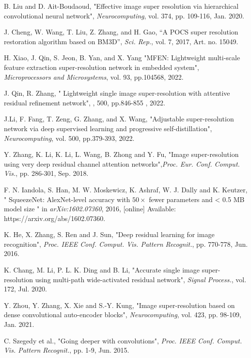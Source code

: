 \documentclass{ieeeaccess}
\begin{document}
\begin{thebibliography}{00}
 B. Liu and D. Ait-Boudaoud, "Effective image super resolution via hierarchical convolutional neural network", \textit{Neurocomputing}, vol. 374, pp. 109-116, Jan. 2020.



 J. Cheng, W. Wang, T. Liu, Z. Zhang, and H. Gao, “A POCS super resolution restoration algorithm based on BM3D”, \textit{Sci. Rep.}, vol. 7, 2017, Art. no. 15049.


 H. Xiao, J. Qin, S. Jeon, B. Yan, and X. Yang "MFEN: Lightweight multi-scale feature extraction super-resolution network in embedded system", \textit{Microprocessors and Microsystems}, vol. 93, pp.104568, 2022.


 J. Qin, R. Zhang, " Lightweight single image super-resolution with attentive residual refinement network", , 500, pp.846-855 , 2022.


J.Li, F. Fang, T. Zeng, G. Zhang, and X. Wang, "Adjustable super-resolution network via deep supervised learning and progressive self-distillation", \textit{Neurocomputing}, vol. 500, pp.379-393, 2022.



 Y. Zhang, K. Li, K. Li, L. Wang, B. Zhong and Y. Fu, "Image super-resolution using very deep residual channel attention networks",\textit{Proc. Eur. Conf. Comput. Vis.}, pp. 286-301, Sep. 2018.



 F. N. Iandola, S. Han, M. W. Moskewicz, K. Ashraf, W. J. Dally and K. Keutzer, " SqueezeNet: AlexNet-level accuracy with $50\times$ fewer parameters and < 0.5 MB model size " in \textit{arXiv:1602.07360}, 2016,
[online] Available: https://arxiv.org/abs/1602.07360.


 K. He, X. Zhang, S. Ren and J. Sun, "Deep residual learning for image recognition", \textit{Proc. IEEE Conf. Comput. Vis. Pattern Recognit.}, pp. 770-778, Jun. 2016.


 K. Chang, M. Li, P. L. K. Ding and B. Li, "Accurate single image super-resolution using multi-path wide-activated residual network",  \textit{Signal Process.}, vol. 172, Jul. 2020.


 Y. Zhou, Y. Zhang, X. Xie and S.-Y. Kung, "Image super-resolution based on dense convolutional auto-encoder blocks", \textit{Neurocomputing}, vol. 423, pp. 98-109, Jan. 2021.


 C. Szegedy et al., "Going deeper with convolutions", \textit{Proc. IEEE Conf. Comput. Vis. Pattern Recognit.}, pp. 1-9, Jun. 2015.



\end{thebibliography}
\end{document}
